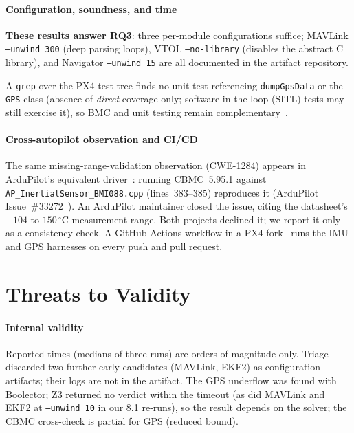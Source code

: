 \documentclass[conference]{IEEEtran}
\newcommand{\entra}[1]{#1}
\newcommand{\corr}[1]{#1}
\begin{document}
\paragraph{Configuration, soundness, and time}
\begin{rqbox}
\textbf{These results answer RQ3}: three per-module configurations
suffice; MAVLink \texttt{--unwind~300} (deep parsing loops), VTOL
\texttt{--no-library} (disables the abstract C library),
and Navigator \texttt{--unwind~15} are all documented in the artifact
repository.
\end{rqbox}
A \texttt{grep} over the PX4 test tree finds no unit test referencing
\texttt{dumpGpsData} or the \texttt{GPS} class (absence of
\emph{direct} coverage only; \entra{software-in-the-loop (SITL)} tests may still exercise it), so BMC and unit testing remain
complementary~\cite{Godefroid2005,Khatiri2024}.

\paragraph{Cross-autopilot observation and CI/CD}
The same missing-range-validation observation (CWE-1284) appears in
ArduPilot's equivalent driver~\cite{ArduPilot}: running CBMC~5.95.1 against
\texttt{AP\_InertialSensor\_BMI088.cpp} (lines~383--385) reproduces it (ArduPilot
Issue~\#33272~\cite{ArduPilot_Issue33272}).
\corr{An ArduPilot maintainer closed the issue, citing the datasheet's $-104$ to $150\,^\circ$C measurement range.} Both projects declined it; we report it only
as a consistency check.
A GitHub Actions workflow in a PX4
fork~\cite{PX4_Fork}
runs the IMU and GPS harnesses on every push and pull request.

\section{Threats to Validity}
\label{sec:threats}

\paragraph{Internal validity}
Reported times (medians of three runs) are orders-of-magnitude only.
Triage discarded two further early candidates (MAVLink, EKF2) as configuration artifacts; their logs are not in the artifact. The GPS underflow was found with Boolector; Z3 returned no verdict within the timeout (as did MAVLink and EKF2 at \texttt{--unwind~10} in our 8.1 re-runs), so the result depends on the solver;
the CBMC cross-check is partial for GPS (reduced bound).
\end{document}
